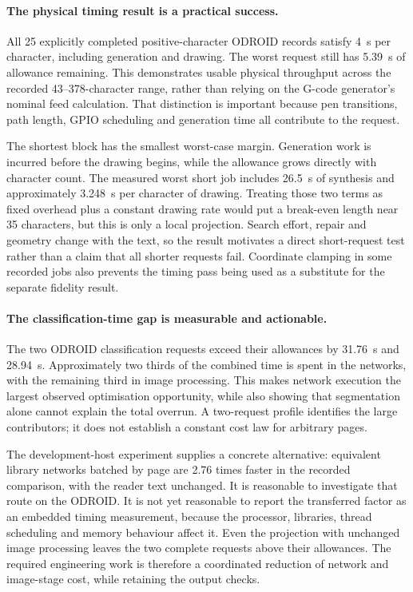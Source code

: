 \paragraph{The physical timing result is a practical success.}
All 25 explicitly completed positive-character ODROID records satisfy 4~s per character, including generation and drawing. The worst request still has 5.39~s of allowance remaining. This demonstrates usable physical throughput across the recorded 43--378-character range, rather than relying on the G-code generator's nominal feed calculation. That distinction is important because pen transitions, path length, GPIO scheduling and generation time all contribute to the request.

The shortest block has the smallest worst-case margin. Generation work is incurred before the drawing begins, while the allowance grows directly with character count. The measured worst short job includes 26.5~s of synthesis and approximately 3.248~s per character of drawing. Treating those two terms as fixed overhead plus a constant drawing rate would put a break-even length near 35 characters, but this is only a local projection. Search effort, repair and geometry change with the text, so the result motivates a direct short-request test rather than a claim that all shorter requests fail. Coordinate clamping in some recorded jobs also prevents the timing pass being used as a substitute for the separate fidelity result.

\paragraph{The classification-time gap is measurable and actionable.}
The two ODROID classification requests exceed their allowances by 31.76~s and 28.94~s. Approximately two thirds of the combined time is spent in the networks, with the remaining third in image processing. This makes network execution the largest observed optimisation opportunity, while also showing that segmentation alone cannot explain the total overrun. A two-request profile identifies the large contributors; it does not establish a constant cost law for arbitrary pages.

The development-host experiment supplies a concrete alternative: equivalent library networks batched by page are 2.76 times faster in the recorded comparison, with the reader text unchanged. It is reasonable to investigate that route on the ODROID. It is not yet reasonable to report the transferred factor as an embedded timing measurement, because the processor, libraries, thread scheduling and memory behaviour affect it. Even the projection with unchanged image processing leaves the two complete requests above their allowances. The required engineering work is therefore a coordinated reduction of network and image-stage cost, while retaining the output checks.

